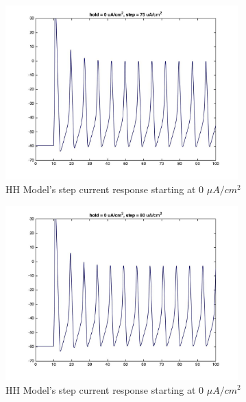 \documentclass{beamer}
\begin{document}
\begin{frame}
  \begin{figure}
    \centering
    \includegraphics[width = 0.8\textwidth]{./images/current_0_75.jpg}
    \caption{HH Model's step current response starting at 0 $\mu A/cm^2$}
  \end{figure}
\end{frame}


\begin{frame}
  \begin{figure}
    \centering
    \includegraphics[width = 0.8\textwidth]{./images/current_0_80.jpg}
    \caption{HH Model's step current response starting at 0 $\mu A/cm^2$}
  \end{figure}
\end{frame}
\end{document}
